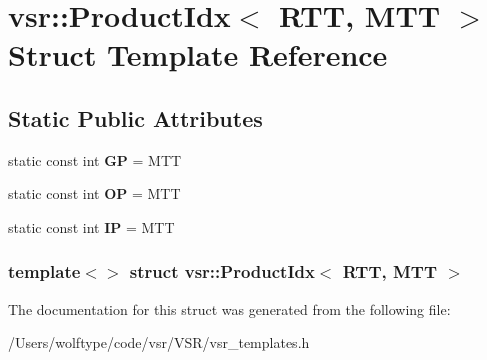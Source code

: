 \hypertarget{structvsr_1_1_product_idx_3_01_r_t_t_00_01_m_t_t_01_4}{\section{vsr\-:\-:Product\-Idx$<$ R\-T\-T, M\-T\-T $>$ Struct Template Reference}
\label{structvsr_1_1_product_idx_3_01_r_t_t_00_01_m_t_t_01_4}
}
\subsection*{Static Public Attributes}
\begin{DoxyCompactItemize}
\item 
\hypertarget{structvsr_1_1_product_idx_3_01_r_t_t_00_01_m_t_t_01_4_aa561acb9d2999e5054318c8305d90427}{static const int {\bfseries G\-P} = M\-T\-T}\label{structvsr_1_1_product_idx_3_01_r_t_t_00_01_m_t_t_01_4_aa561acb9d2999e5054318c8305d90427}

\item 
\hypertarget{structvsr_1_1_product_idx_3_01_r_t_t_00_01_m_t_t_01_4_a9a757f2b5935cef95e2424b9e31f9587}{static const int {\bfseries O\-P} = M\-T\-T}\label{structvsr_1_1_product_idx_3_01_r_t_t_00_01_m_t_t_01_4_a9a757f2b5935cef95e2424b9e31f9587}

\item 
\hypertarget{structvsr_1_1_product_idx_3_01_r_t_t_00_01_m_t_t_01_4_a9451df4dd548f0ec3003a69c0528d559}{static const int {\bfseries I\-P} = M\-T\-T}\label{structvsr_1_1_product_idx_3_01_r_t_t_00_01_m_t_t_01_4_a9451df4dd548f0ec3003a69c0528d559}

\end{DoxyCompactItemize}
\subsubsection*{template$<$$>$ struct vsr\-::\-Product\-Idx$<$ R\-T\-T, M\-T\-T $>$}



The documentation for this struct was generated from the following file\-:\begin{DoxyCompactItemize}
\item 
/\-Users/wolftype/code/vsr/\-V\-S\-R/vsr\-\_\-templates.\-h\end{DoxyCompactItemize}
